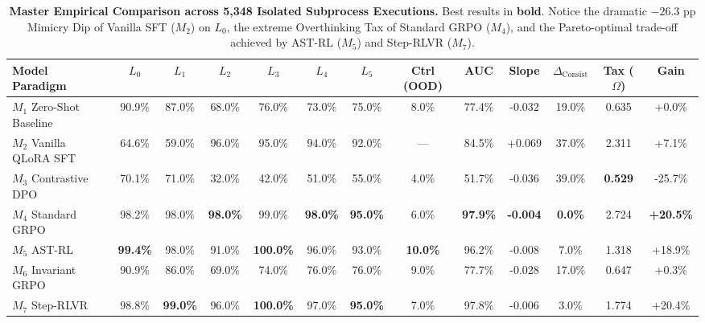\documentclass[10pt,twocolumn,letterpaper]{article}
\begin{document}
\begin{table}[t]
\centering
\small
\caption{\textbf{Master Empirical Comparison across 5,348 Isolated Subprocess Executions.} Best results in \textbf{bold}. Notice the dramatic $-26.3$ pp Mimicry Dip of Vanilla SFT ($M_2$) on $L_0$, the extreme Overthinking Tax of Standard GRPO ($M_4$), and the Pareto-optimal trade-off achieved by AST-RL ($M_5$) and Step-RLVR ($M_7$).}
\label{tab:master}
\begin{tabularx}{\textwidth}{lcccccccccccc}
\toprule
\textbf{Model Paradigm} & \textbf{$L_0$} & \textbf{$L_1$} & \textbf{$L_2$} & \textbf{$L_3$} & \textbf{$L_4$} & \textbf{$L_5$} & \textbf{Ctrl (OOD)} & \textbf{AUC} & \textbf{Slope} & \textbf{$\Delta_{\text{Consist}}$} & \textbf{Tax ($\Omega$)} & \textbf{Gain} \\
\midrule
$M_1$ Zero-Shot Baseline & 90.9\% & 87.0\% & 68.0\% & 76.0\% & 73.0\% & 75.0\% & 8.0\% & 77.4\% & -0.032 & 19.0\% & 0.635 & +0.0\% \\
$M_2$ Vanilla QLoRA SFT & 64.6\% & 59.0\% & 96.0\% & 95.0\% & 94.0\% & 92.0\% & --- & 84.5\% & +0.069 & 37.0\% & 2.311 & +7.1\% \\
$M_3$ Contrastive DPO & 70.1\% & 71.0\% & 32.0\% & 42.0\% & 51.0\% & 55.0\% & 4.0\% & 51.7\% & -0.036 & 39.0\% & \textbf{0.529} & -25.7\% \\
$M_4$ Standard GRPO & 98.2\% & 98.0\% & \textbf{98.0\%} & 99.0\% & \textbf{98.0\%} & \textbf{95.0\%} & 6.0\% & \textbf{97.9\%} & \textbf{-0.004} & \textbf{0.0\%} & 2.724 & \textbf{+20.5\%} \\
$M_5$ AST-RL & \textbf{99.4\%} & 98.0\% & 91.0\% & \textbf{100.0\%} & 96.0\% & 93.0\% & \textbf{10.0\%} & 96.2\% & -0.008 & 7.0\% & 1.318 & +18.9\% \\
$M_6$ Invariant GRPO & 90.9\% & 86.0\% & 69.0\% & 74.0\% & 76.0\% & 76.0\% & 9.0\% & 77.7\% & -0.028 & 17.0\% & 0.647 & +0.3\% \\
$M_7$ Step-RLVR & 98.8\% & \textbf{99.0\%} & 96.0\% & \textbf{100.0\%} & 97.0\% & \textbf{95.0\%} & 7.0\% & 97.8\% & -0.006 & 3.0\% & 1.774 & +20.4\% \\
\bottomrule
\end{tabularx}
\end{table}
\end{document}

